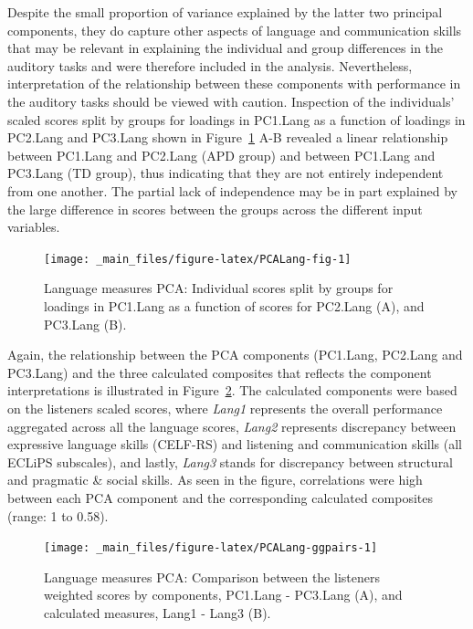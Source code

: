 \documentclass[a4paper, twoside]{templates/ociamthesis}
\begin{document}
Despite the small proportion of variance explained by the latter two principal components, they do capture other aspects of language and communication skills that may be relevant in explaining the individual and group differences in the auditory tasks and were therefore included in the analysis. Nevertheless, interpretation of the relationship between these components with performance in the auditory tasks should be viewed with caution. Inspection of the individuals' scaled scores split by groups for loadings in PC1.Lang as a function of loadings in PC2.Lang and PC3.Lang shown in Figure~\ref{fig:PCALang-fig} A-B revealed a linear relationship between PC1.Lang and PC2.Lang (APD group) and between PC1.Lang and PC3.Lang (TD group), thus indicating that they are not entirely independent from one another. The partial lack of independence may be in part explained by the large difference in scores between the groups across the different input variables.\\

\begin{figure}

{\centering \texttt{[image: \_main\_files/figure-latex/PCALang-fig-1]} 

}

\caption{Language measures PCA: Individual scores split by groups for loadings in PC1.Lang as a function of scores for PC2.Lang (A), and PC3.Lang (B).}\label{fig:PCALang-fig}
\end{figure}

Again, the relationship between the PCA components (PC1.Lang, PC2.Lang and PC3.Lang) and the three calculated composites that reflects the component interpretations is illustrated in Figure~\ref{fig:PCALang-ggpairs}. The calculated components were based on the listeners scaled scores, where \emph{Lang1} represents the overall performance aggregated across all the language scores, \emph{Lang2} represents discrepancy between expressive language skills (CELF-RS) and listening and communication skills (all ECLiPS subscales), and lastly, \emph{Lang3} stands for discrepancy between structural and pragmatic \& social skills. As seen in the figure, correlations were high between each PCA component and the corresponding calculated composites (range: 1 to 0.58).\\

\begin{figure}

{\centering \texttt{[image: \_main\_files/figure-latex/PCALang-ggpairs-1]} 

}

\caption{Language measures PCA: Comparison between the listeners weighted scores by components, PC1.Lang - PC3.Lang (A), and calculated measures, Lang1 - Lang3 (B).}\label{fig:PCALang-ggpairs}
\end{figure}
\end{document}
